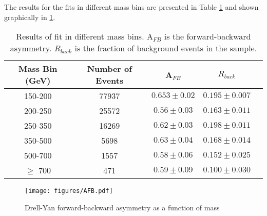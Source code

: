 \documentclass[
10pt, %
a4paper, %
oneside, %
headinclude,footinclude, %
BCOR5mm, %
]{scrartcl}
\begin{document}
The results for the fits in different mass bins are presented in Table \ref{tab:results} and shown
graphically in \ref{fig:AFB}.


\begin{table}[htp]
    \centering
    \label{tab:results}

    \caption{ Results of fit in different mass bins. A$_{FB}$ is the forward-backward asymmetry.
 $R_{back}$ is the fraction of background events in the sample. }
\begin{tabular}{|| c | c | c | c | c ||}
    \hline
    Mass Bin (GeV)  & Number of Events &  
    A$_{FB}$ & $R_{back}$\\
 \hline \hline
 150-200 & 77937 & $0.653 \pm 0.02$ & $0.195 \pm 0.007$    \\
 200-250 & 25572 & $0.56 \pm 0.03$ & $0.163 \pm 0.011$   \\
 250-350 & 16269 & $0.62 \pm 0.03$ & $0.198 \pm 0.011$   \\
 350-500 & 5698 & $0.63 \pm 0.04$ & $0.168 \pm 0.014$    \\
 500-700 & 1557 & $0.58 \pm 0.06$ & $0.152 \pm 0.025$    \\
 $\geq$ 700 & 471 & $0.59 \pm 0.09$ & $0.100 \pm 0.030$   \\



 \hline

 \end{tabular}

\end{table}

\begin{figure}[tb]
    \label{fig:AFB}
    \texttt{[image: figures/AFB.pdf]}
    \caption{Drell-Yan forward-backward asymmetry as a function of mass}
\end{figure}
    


\end{document}
